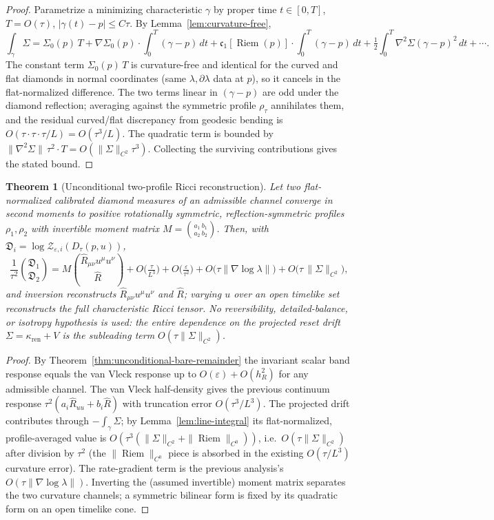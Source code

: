 \documentclass[11pt]{article}
\newtheorem{theorem}{Theorem}[section]
\theoremstyle{definition}
\theoremstyle{remark}
\newcommand{\eps}{\varepsilon}
\newcommand{\ren}{\mathrm{ren}}
\newcommand{\Riem}{\operatorname{Riem}}
\newcommand{\kren}{\kappa_{\ren}}
\begin{document}
\begin{proof}
Parametrize a minimizing characteristic $\gamma$ by proper time $t\in[0,T]$,
$T=O(\tau)$, $|\gamma(t)-p|\le C\tau$.  By Lemma~\ref{lem:curvature-free},
\[
 \int_\gamma\Sigma
 =\Sigma_0(p)\,T
 +\nabla\Sigma_0(p)\!\cdot\!\!\int_0^T(\gamma-p)\,dt
 +\mathfrak c_1[\Riem(p)]\!\cdot\!\!\int_0^T(\gamma-p)\,dt
 +\tfrac12\!\int_0^T\!\nabla^2\Sigma(\gamma-p)^2\,dt+\cdots.
\]
The constant term $\Sigma_0(p)\,T$ is curvature-free and identical for the curved
and flat diamonds in normal coordinates (same $\lambda,\partial\lambda$ data at
$p$), so it cancels in the flat-normalized difference.  The two terms linear in
$(\gamma-p)$ are odd under the diamond reflection; averaging against the symmetric
profile $\rho_\tau$ annihilates them, and the residual curved/flat discrepancy from
geodesic bending is $O(\tau\cdot\tau\cdot\tau/L)=O(\tau^3/L)$.  The quadratic term is
bounded by $\|\nabla^2\Sigma\|\,\tau^2\cdot T=O(\|\Sigma\|_{C^2}\tau^3)$.  Collecting
the surviving contributions gives the stated bound.
\end{proof}

\begin{theorem}[Unconditional two-profile Ricci reconstruction]
\label{thm:unconditional-ricci}
Let two flat-normalized calibrated diamond measures of an admissible channel
converge in second moments to positive rotationally symmetric, reflection-symmetric
profiles $\rho_1,\rho_2$ with invertible moment matrix $M=\binom{a_1\ b_1}{a_2\ b_2}$.
Then, with $\mathfrak D_i=\log\mathcal Z_{\eps,i}(D_\tau(p,u))$,
\[
 \frac1{\tau^2}\binom{\mathfrak D_1}{\mathfrak D_2}
 =M\binom{\widehat R_{\mu\nu}u^\mu u^\nu}{\widehat R}
 +O\!\Big(\tfrac{\tau}{L^3}\Big)+O\!\Big(\tfrac{\eps}{\tau^2}\Big)
 +O\bigl(\tau\|\nabla\log\lambda\|\bigr)
 +O\bigl(\tau\,\|\Sigma\|_{C^2}\bigr),
\]
and inversion reconstructs $\widehat R_{\mu\nu}u^\mu u^\nu$ and $\widehat R$;
varying $u$ over an open timelike set reconstructs the full characteristic Ricci
tensor.  No reversibility, detailed-balance, or isotropy hypothesis is used: the
entire dependence on the projected reset drift $\Sigma=\kren+V$ is the
\emph{subleading} term $O(\tau\|\Sigma\|_{C^2})$.
\end{theorem}

\begin{proof}
By Theorem~\ref{thm:unconditional-bare-remainder} the invariant scalar band response equals the van
Vleck response up to $O(\eps)+O(h_R^2)$ for any admissible channel.  The van Vleck
half-density gives the previous continuum response
$\tau^2(a_i\widehat R_{uu}+b_i\widehat R)$ with truncation error $O(\tau^3/L^3)$.
The projected drift contributes through $-\int_\gamma\Sigma$; by
Lemma~\ref{lem:line-integral} its flat-normalized, profile-averaged value is
$O(\tau^3(\|\Sigma\|_{C^2}+\|\Riem\|_{C^0}))$, i.e.\ $O(\tau\|\Sigma\|_{C^2})$ after
division by $\tau^2$ (the $\|\Riem\|_{C^0}$ piece is absorbed in the existing
$O(\tau/L^3)$ curvature error).  The rate-gradient term is the previous analysis's
$O(\tau\|\nabla\log\lambda\|)$.  Inverting the (assumed invertible) moment matrix
separates the two curvature channels; a symmetric bilinear form is fixed by its
quadratic form on an open timelike cone.
\end{proof}
\end{document}

